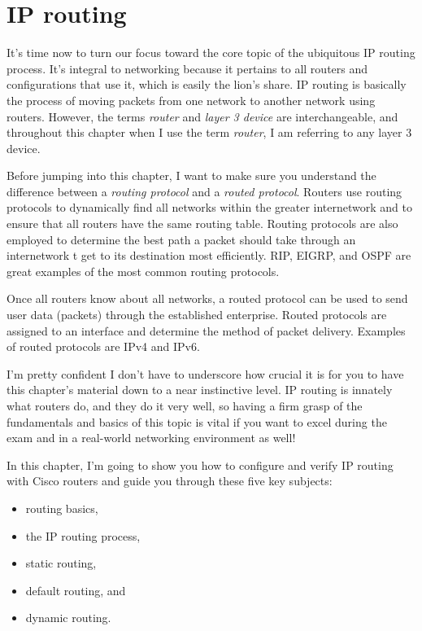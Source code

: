 \chapter{IP routing}
\label{chap:ip-routing}

It's time now to turn our focus toward the core topic of the ubiquitous IP routing process.
It's integral to networking because it pertains to all routers and configurations that use it, which is easily the lion's share.
IP routing is basically the process of moving packets from one network to another network using routers.
However, the terms \emph{router} and \emph{layer 3 device} are interchangeable, and throughout this chapter when I use the term \emph{router},
I am referring to any layer 3 device.

Before jumping into this chapter, I want to make sure you understand the difference between a \emph{routing protocol} and a \emph{routed protocol}.
Routers use routing protocols to dynamically find all networks within the greater internetwork and to ensure that all routers have the same routing table.
Routing protocols are also employed to determine the best path a packet should take through an internetwork t get to its destination most efficiently.
RIP, EIGRP, and OSPF are great examples of the most common routing protocols.

Once all routers know about all networks, a routed protocol can be used to send user data (packets) through the established enterprise.
Routed protocols are assigned to an interface and determine the method of packet delivery.
Examples of routed protocols are IPv4 and IPv6.

I'm pretty confident I don't have to underscore how crucial it is for you to have this chapter's material down to a near instinctive level.
IP routing is innately what routers do, and they do it very well,
so having a firm grasp of the fundamentals and basics of this topic is vital if you want to excel during the exam and in a real-world networking environment as well!

In this chapter, I'm going to show you how to configure and verify IP routing with Cisco routers and guide you through these five key subjects:
\begin{itemize}
\item routing basics,
\item the IP routing process,
\item static routing,
\item default routing, and
\item dynamic routing.
\end{itemize}

